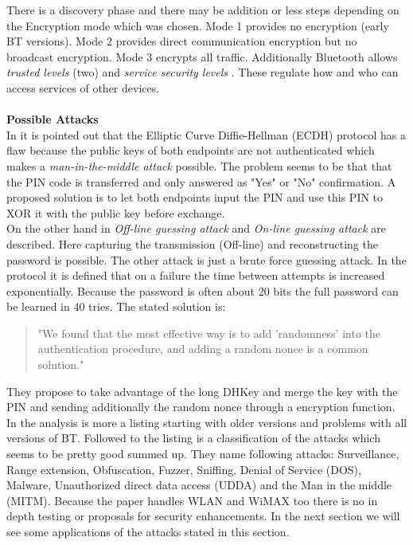 \documentclass[12pt,a4paper]{article}
\begin{document}
There is a discovery phase and there may be addition or less steps depending on the Encryption mode which was chosen. Mode 1 provides no encryption (early BT versions). Mode 2 provides direct communication encryption but no broadcast encryption. Mode 3 encrypts all traffic. Additionally Bluetooth allows \emph{trusted levels} (two) and \emph{service security levels} \cite{DBLP:journals/ijnsec/Lackner13}. These regulate how and who can access services of other devices.
\\
\\
\textbf{Possible Attacks}\\
In \cite{DBLP:journals/ijnsec/YehPWH12} it is pointed out that the Elliptic Curve Diffie-Hellman (ECDH) protocol has a flaw because the public keys of both endpoints are not authenticated which makes a \emph{man-in-the-middle attack} possible. The problem seems to be that that the PIN code is transferred and only answered as "Yes" or "No" confirmation. A proposed solution is to let both endpoints input the PIN and use this PIN to XOR it with the public key before exchange.\\
On the other hand in \cite{DBLP:conf/apnoms/FanSL11} \emph{Off-line guessing attack} and \emph{On-line guessing attack} are described. Here capturing the transmission (Off-line) and reconstructing the password is possible. The other attack is just a brute force guessing attack. In the protocol it is defined that on a failure the time between attempts is increased exponentially. Because the password is often about 20 bits the full password can be learned in 40 tries. The stated solution is:
\begin{quote}
"We found that the most effective way is to add 'randomness' into the authentication procedure, and adding a random nonce is a common solution."\cite{DBLP:conf/apnoms/FanSL11}
\end{quote}
They propose to take advantage of the long DHKey and merge the key with the PIN and sending additionally the random nonce through a encryption function.\\
In \cite{DBLP:journals/ijnsec/Lackner13} the analysis is more a listing starting with older versions and problems with all versions of BT. Followed to the listing is a classification of the attacks which seems to be pretty good summed up. They name following attacks: Surveillance, Range extension, Obfuscation, Fuzzer, Sniffing, Denial of Service (DOS), Malware, Unauthorized direct data access (UDDA) and the Man in the middle (MITM). Because the paper handles WLAN and WiMAX too there is no in depth testing or proposals for security enhancements. In the next section we will see some applications of the attacks stated in this section.
\end{document}
